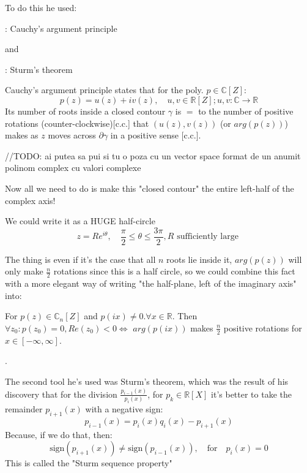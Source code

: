 To do this he used:

: Cauchy's argument principle

and

: Sturm's theorem


Cauchy's argument principle states that for the poly. $p \in \mathbb{C}[Z]$:
\[
  p(z) = u(z) + i v(z), \quad u, v \in \mathbb{R}[Z]; u,v : \mathbb{C} \rightarrow \mathbb{R}
\]
Its number of roots inside a closed contour $\gamma$  is $=$ to the number of positive rotations (counter-clockwise)[c.c.] that $(u(z), v(z))$ (or $arg(p(z))$) makes as $z$ moves across $\partial \gamma$ in a positive sense [c.c.].

//TODO: ai putea sa pui si tu o poza cu un vector space format de un anumit polinom complex cu valori complexe

Now all we need to do is make this "closed contour" the entire left-half of the complex axis!

We could write it as a {\large HUGE} half-circle
\[
  z = Re^{i \theta}, \quad \frac{\pi}{2} \leq \theta \leq \frac{3 \pi}{2}, R \text{ sufficiently large }
\]

The thing is even if it's the case that all $n$ roots lie inside it, $arg(p(z))$ will only make $\frac{n}{2}$ rotations since this is a half circle, so we could combine this fact with a more elegant way of writing "the half-plane, left of the imaginary axis" into:

\begin{lemma}\label{cauchy_arg_lemma}
  For $p(z) \in \mathbb{C}_n[Z]$ and $p(ix) \neq 0. \forall x \in \mathbb{R}$. Then $\forall z_0 : p(z_0) = 0, Re(z_0) < 0 \iff$ $arg(p(ix))$ makes $\frac{n}{2}$ positive rotations for $x \in [-\infty , \infty]$.
\end{lemma}

.

The second tool he's used was Sturm's theorem, which was the result of his discovery that for the division $\frac{p_{i-1}(x)}{p_i(x)}$, for $p_k \in \mathbb{R}[X]$ it's better to take the remainder $p_{i+1}(x)$ with a negative sign:
\begin{equation}\label{euclid_algorithm}
  p_{i-1}(x) = p_i(x) q_i(x) - p_{i+1}(x) \tag{Euclid's Algorithm}
\end{equation}
Because, if we do that, then:
\begin{equation}\label{sturm_seq_property}
  \text{sign} ( p_{i+1}(x) )  \neq \text{sign} ( p_{i-1}(x) ), \quad \text{for} \quad p_i(x)=0 \tag{Sturm. Seq. Property}
\end{equation}
This is called the "Sturm sequence property"

